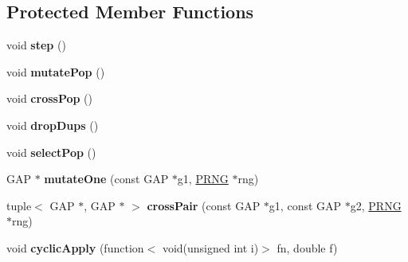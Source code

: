 \subsection*{Protected Member Functions}
\begin{DoxyCompactItemize}
\item 
\hypertarget{class_k_base_1_1_g_a_opt_a1f92c5390aa9398a58ea6f6b0f4640dd}{void {\bfseries step} ()}\label{class_k_base_1_1_g_a_opt_a1f92c5390aa9398a58ea6f6b0f4640dd}

\item 
\hypertarget{class_k_base_1_1_g_a_opt_af300a4b2be804e4173480bae2f2ea002}{void {\bfseries mutate\-Pop} ()}\label{class_k_base_1_1_g_a_opt_af300a4b2be804e4173480bae2f2ea002}

\item 
\hypertarget{class_k_base_1_1_g_a_opt_a99312a5f465ffc92f28d25d42f41217f}{void {\bfseries cross\-Pop} ()}\label{class_k_base_1_1_g_a_opt_a99312a5f465ffc92f28d25d42f41217f}

\item 
\hypertarget{class_k_base_1_1_g_a_opt_af145546dafca23061d112cbaa1d5d004}{void {\bfseries drop\-Dups} ()}\label{class_k_base_1_1_g_a_opt_af145546dafca23061d112cbaa1d5d004}

\item 
\hypertarget{class_k_base_1_1_g_a_opt_a7ea4d2e234ab37149e104f0238bbefda}{void {\bfseries select\-Pop} ()}\label{class_k_base_1_1_g_a_opt_a7ea4d2e234ab37149e104f0238bbefda}

\item 
\hypertarget{class_k_base_1_1_g_a_opt_adaf83b9b8c59840fbbf40b4d928952a2}{G\-A\-P $\ast$ {\bfseries mutate\-One} (const G\-A\-P $\ast$g1, \hyperlink{class_k_base_1_1_p_r_n_g}{P\-R\-N\-G} $\ast$rng)}\label{class_k_base_1_1_g_a_opt_adaf83b9b8c59840fbbf40b4d928952a2}

\item 
\hypertarget{class_k_base_1_1_g_a_opt_aefff59e83d40ab47d20a0866db05d25b}{tuple$<$ G\-A\-P $\ast$, G\-A\-P $\ast$ $>$ {\bfseries cross\-Pair} (const G\-A\-P $\ast$g1, const G\-A\-P $\ast$g2, \hyperlink{class_k_base_1_1_p_r_n_g}{P\-R\-N\-G} $\ast$rng)}\label{class_k_base_1_1_g_a_opt_aefff59e83d40ab47d20a0866db05d25b}

\item 
\hypertarget{class_k_base_1_1_g_a_opt_ae9a4bcd82674244186378250ab4fafc0}{void {\bfseries cyclic\-Apply} (function$<$ void(unsigned int i)$>$ fn, double f)}\label{class_k_base_1_1_g_a_opt_ae9a4bcd82674244186378250ab4fafc0}

\end{DoxyCompactItemize}

